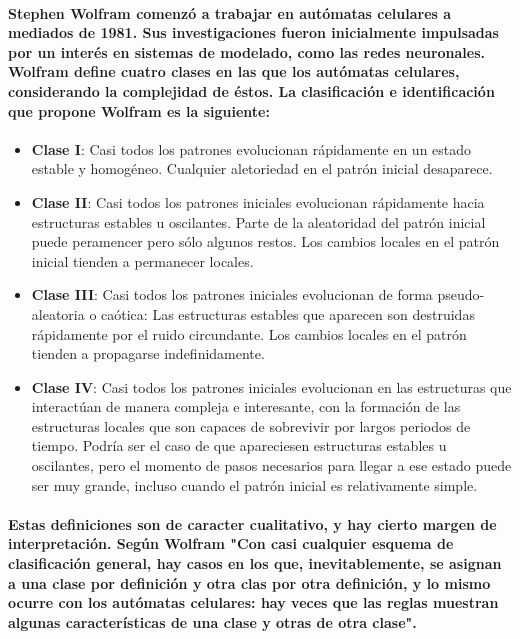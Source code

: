     \paragraph{Stephen Wolfram comenzó a trabajar en autómatas celulares a mediados de 1981. Sus investigaciones fueron inicialmente impulsadas por un interés en sistemas de modelado, como las redes neuronales. Wolfram define cuatro clases en las que los autómatas celulares, considerando la complejidad de éstos. La clasificación e identificación que propone Wolfram es la siguiente:}
      \begin{itemize}
        \item{\textbf{Clase I}: Casi todos los patrones evolucionan rápidamente en un estado estable y homogéneo. Cualquier aletoriedad en el patrón inicial desaparece.}
        \item{\textbf{Clase II}: Casi todos los patrones iniciales evolucionan rápidamente hacia estructuras estables u oscilantes. Parte de la aleatoridad del patrón inicial puede peramencer pero sólo algunos restos. Los cambios locales en el patrón inicial tienden a permanecer locales.}
        \item{\textbf{Clase III}: Casi todos los patrones iniciales evolucionan de forma pseudo-aleatoria o caótica: Las estructuras estables que aparecen son destruidas rápidamente por el ruido circundante. Los cambios locales en el patrón tienden a propagarse indefinidamente.}
        \item{\textbf{Clase IV}: Casi todos los patrones iniciales evolucionan en las estructuras que interactúan de manera compleja e interesante, con la formación de las estructuras locales que son capaces de sobrevivir por largos periodos de tiempo. Podría ser el caso de que apareciesen estructuras estables u oscilantes, pero el momento de pasos necesarios para llegar a ese estado puede ser muy grande, incluso cuando el patrón inicial es relativamente simple.}
      \end{itemize}
    \paragraph{Estas definiciones son de caracter cualitativo, y hay cierto margen de interpretación. Según Wolfram "Con casi cualquier esquema de clasificación general, hay casos en los que, inevitablemente, se asignan a una clase por definición y otra clas por otra definición, y lo mismo ocurre con los autómatas celulares: hay veces que las reglas muestran algunas características de una clase y otras de otra clase".\cite{11}}